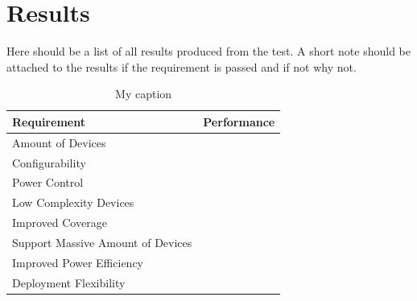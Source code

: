 \section{Results}
Here should be a list of all results produced from the test. A short note should be attached to the results if the requirement is passed and if not why not.

\begin{table}[H]
\centering
\begin{tabular}{|l|l|} \hline
\textbf{Requirement}              & \textbf{Performance} \\ \hline
Amount of Devices                 &                      \\ \hline
Configurability                   &                      \\ \hline
Power Control                     &                      \\ \hline
Low Complexity Devices            &                      \\ \hline
Improved Coverage                 &                      \\ \hline
Support Massive Amount of Devices &                      \\ \hline
Improved Power Efficiency         &                      \\ \hline
Deployment Flexibility            &                      \\ \hline
\end{tabular}
\caption{My caption}
\label{my-label2}
\end{table}

